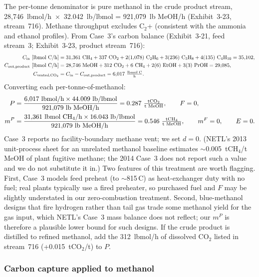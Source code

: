 \documentclass[11pt]{article}
\newcommand{\cotwo}{\ensuremath{\mathrm{CO_2}}}
\newcommand{\chfour}{\ensuremath{\mathrm{CH_4}}}
\begin{document}
The per-tonne denominator is pure methanol in the crude product stream, 28{,}746~lbmol/h~$\times$~32.042~lb/lbmol = 921{,}079~lb MeOH/h (Exhibit~3-23, stream~716). Methane throughput excludes C$_2$+ (consistent with the ammonia and ethanol profiles). From Case~3's carbon balance (Exhibit~3-21, feed stream~3; Exhibit~3-23, product stream~716):
%
\begin{align*}
  C_{\text{in}}~[\text{lbmol C/h}] &= 31{,}361~\chfour{} + 337~\cotwo{} + 2(1{,}078)~\text{C}_2\text{H}_6 + 3(236)~\text{C}_3\text{H}_8 + 4(135)~\text{C}_4\text{H}_{10} = 35{,}102, \\
  C_{\text{out,product}}~[\text{lbmol C/h}] &= 28{,}746~\text{MeOH} + 312~\cotwo{} + 6~\chfour{} + 2(6)~\text{EtOH} + 3(3)~\text{PrOH} = 29{,}085, \\
  C_{\text{vented,\cotwo{}}} &= C_{\text{in}} - C_{\text{out,product}} = 6{,}017~\tfrac{\text{lbmol C}}{\text{h}}.
\end{align*}
%
Converting each per-tonne-of-methanol:
%
\begin{align*}
  P &= \frac{6{,}017~\text{lbmol/h} \times 44.009~\text{lb/lbmol}}{921{,}079~\text{lb MeOH/h}} = 0.287~\tfrac{\text{t\cotwo{}}}{\text{t MeOH}}, \qquad F = 0, \\
  m^P &= \frac{31{,}361~\text{lbmol \chfour{}/h} \times 16.043~\text{lb/lbmol}}{921{,}079~\text{lb MeOH/h}} = 0.546~\tfrac{\text{t\chfour{}}}{\text{t MeOH}}, \qquad m^F = 0, \qquad E = 0.
\end{align*}
%
Case~3 reports no facility-boundary methane vent; we set $d = 0$. (NETL's 2013 unit-process sheet for an unrelated methanol baseline estimates $\sim$0.005~t\chfour{}/t MeOH of plant fugitive methane; the 2014 Case~3 does not report such a value and we do not substitute it in.) Two features of this treatment are worth flagging. First, Case~3 models feed preheat (to $\sim$815\,\textdegree C) as heat-exchanger duty with no fuel; real plants typically use a fired preheater, so purchased fuel and $F$ may be slightly understated in our zero-combustion treatment. Second, blue-methanol designs that fire hydrogen rather than tail gas trade some methanol yield for the gas input, which NETL's Case~3 mass balance does not reflect; our $m^P$ is therefore a plausible lower bound for such designs.
If the crude product is distilled to refined methanol, add the 312~lbmol/h of dissolved CO$_2$ listed in stream~716 (+0.015~t\cotwo{}/t) to $P$.

\subsubsection{Carbon capture applied to methanol}
\end{document}
